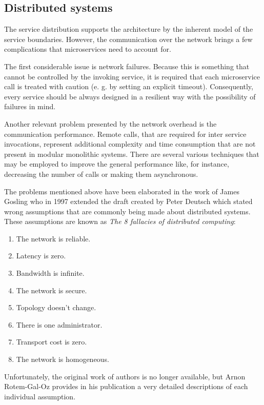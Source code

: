 \documentclass[oneside,
  digital, %
  table,   %
  lof,     %
  lot,     %
]{fithesis3}
\begin{document}
\subsection{Distributed systems}

The service distribution supports the architecture by the inherent model of the service boundaries. However, the communication over the network brings a few complications that microservices need to account for.

The first considerable issue is network failures. Because this is something that cannot be controlled by the invoking service, it is required that each microservice call is treated with caution (e. g. by setting an explicit timeout). Consequently, every service should be always designed in a resilient way with the possibility of failures in mind. 

Another relevant problem presented by the network overhead is the communication performance. Remote calls, that are required for inter service invocations, represent additional complexity and time consumption that are not present in modular monolithic systems. There are several various techniques that may be employed to improve the general performance like, for instance, decreasing the number of calls or making them asynchronous.

The problems mentioned above have been elaborated in the work of James Gosling who in 1997 extended the draft created by Peter Deutsch which stated wrong assumptions that are commonly being made about distributed systems. These assumptions are known as \textit{The 8 fallacies of distributed computing}:

\begin{enumerate}
    \item The network is reliable.
    \item Latency is zero.
    \item Bandwidth is infinite.
    \item The network is secure.
    \item Topology doesn't change.
    \item There is one administrator.
    \item Transport cost is zero.
    \item The network is homogeneous.
\end{enumerate}

\noindent
Unfortunately, the original work of authors is no longer available, but Arnon Rotem-Gal-Oz provides in his publication \cite{fallacies} a very detailed descriptions of each individual assumption.
\end{document}
